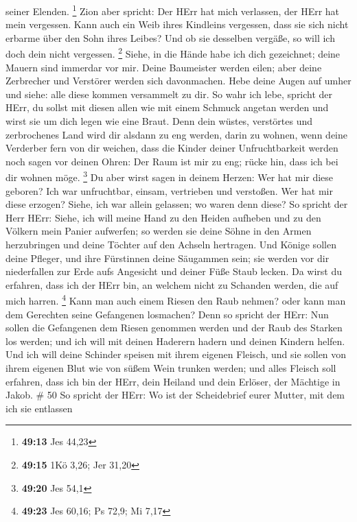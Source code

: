seiner Elenden. \footnote{\textbf{49:13} Jes 44,23}  Zion
aber spricht: Der HErr hat mich verlassen, der HErr hat mein vergessen.
 Kann auch ein Weib ihres Kindleins vergessen, dass sie
sich nicht erbarme über den Sohn ihres Leibes? Und ob sie desselben
vergäße, so will ich doch dein nicht vergessen. \footnote{\textbf{49:15}
  1Kö 3,26; Jer 31,20}  Siehe, in die Hände habe ich dich
gezeichnet; deine Mauern sind immerdar vor mir.  Deine
Baumeister werden eilen; aber deine Zerbrecher und Verstörer werden sich
davonmachen.  Hebe deine Augen auf umher und siehe: alle
diese kommen versammelt zu dir. So wahr ich lebe, spricht der HErr, du
sollst mit diesen allen wie mit einem Schmuck angetan werden und wirst
sie um dich legen wie eine Braut.  Denn dein wüstes,
verstörtes und zerbrochenes Land wird dir alsdann zu eng werden, darin
zu wohnen, wenn deine Verderber fern von dir weichen,  dass
die Kinder deiner Unfruchtbarkeit werden noch sagen vor deinen Ohren:
Der Raum ist mir zu eng; rücke hin, dass ich bei dir wohnen möge.
\footnote{\textbf{49:20} Jes 54,1}  Du aber wirst sagen in
deinem Herzen: Wer hat mir diese geboren? Ich war unfruchtbar, einsam,
vertrieben und verstoßen. Wer hat mir diese erzogen? Siehe, ich war
allein gelassen; wo waren denn diese?  So spricht der Herr
HErr: Siehe, ich will meine Hand zu den Heiden aufheben und zu den
Völkern mein Panier aufwerfen; so werden sie deine Söhne in den Armen
herzubringen und deine Töchter auf den Achseln hertragen. 
Und Könige sollen deine Pfleger, und ihre Fürstinnen deine Säugammen
sein; sie werden vor dir niederfallen zur Erde aufs Angesicht und deiner
Füße Staub lecken. Da wirst du erfahren, dass ich der HErr bin, an
welchem nicht zu Schanden werden, die auf mich harren. \footnote{\textbf{49:23}
  Jes 60,16; Ps 72,9; Mi 7,17}  Kann man auch einem Riesen
den Raub nehmen? oder kann man dem Gerechten seine Gefangenen losmachen?
 Denn so spricht der HErr: Nun sollen die Gefangenen dem
Riesen genommen werden und der Raub des Starken los werden; und ich will
mit deinen Haderern hadern und deinen Kindern helfen.  Und
ich will deine Schinder speisen mit ihrem eigenen Fleisch, und sie
sollen von ihrem eigenen Blut wie von süßem Wein trunken werden; und
alles Fleisch soll erfahren, dass ich bin der HErr, dein Heiland und
dein Erlöser, der Mächtige in Jakob. \# 50  So spricht der
HErr: Wo ist der Scheidebrief eurer Mutter, mit dem ich sie entlassen
